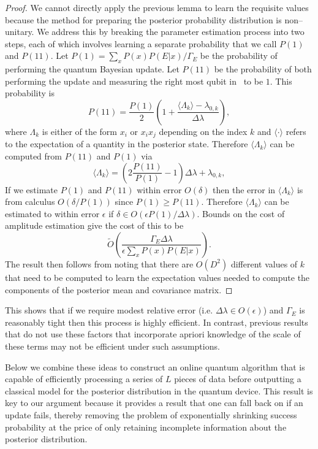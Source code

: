 \documentclass[aps,amsmath,onecolumn,amssymb,notitlepage]{revtex4-1}
\begin{document}
\begin{proof}
We cannot directly apply the previous lemma to learn the requisite values because the method for preparing the posterior probability distribution is non--unitary.
We address this by breaking the parameter estimation process into two steps, each of which involves learning a separate probability that we call $P(1)$ and $P(11)$.
Let $P(1)= \sum_x P(x) P(E|x)/\Gamma_E$ be the probability of performing the quantum Bayesian update.  Let $P(11)$ be the probability of both performing the update and measuring the right most qubit in~ to be $1$.  This probability is
\begin{equation}
P(11) = \frac{P(1)}{2}\left(1+\frac{\langle \Lambda_k \rangle -\lambda_{0,k}}{\Delta \lambda} \right),
\end{equation}
where $\Lambda_k$ is either of the form $x_i$ or $x_ix_j$ depending on the index $k$ and $\langle \cdot \rangle$ refers to the expectation of a quantity in the posterior state.
Therefore $\langle \Lambda_k \rangle$ can be computed from $P(11)$ and $P(1)$ via
\begin{equation}
\langle \Lambda_k \rangle = \left(2\frac{P(11)}{P(1)}-1 \right)\Delta \lambda + \lambda_{0,k},
\end{equation}
If we estimate $P(1)$ and $P(11)$ within error $O(\delta)$ then the error in $\langle \Lambda_k \rangle$ is from calculus $O(\delta/P(1))$ since $P(1)\ge P(11)$.  Therefore $\langle \Lambda_k \rangle$ can be estimated to within error $\epsilon$ if $\delta \in O(\epsilon P(1) /\Delta \lambda)$.  Bounds on the cost of amplitude estimation give the cost of this to be~\cite{BHM+02}
\begin{equation}
\tilde{O} \left(\frac{\Gamma_E \Delta \lambda}{\epsilon \sum_x P(x) P(E|x)} \right).
\end{equation}
The result then follows from noting that there are $O(D^2)$ different values of $k$ that need to be computed to learn the expectation values needed to compute the components of the posterior mean and covariance matrix.
\end{proof}
This shows that if we require modest relative error (i.e. $\Delta \lambda \in O(\epsilon)$) and $\Gamma_E$ is reasonably tight then this process is highly efficient.  In contrast, previous results that do not use these factors that incorporate apriori knowledge of the scale of these terms may not be efficient under such assumptions.

Below we combine these ideas to construct an online quantum algorithm that is capable of efficiently processing a series of $L$ pieces of data before outputting a classical model for the posterior distribution in the quantum device.  This result is key to our argument because it provides a result that one can fall back on if an update fails, thereby removing the problem of exponentially shrinking success probability at the price of only retaining incomplete information about the posterior distribution.
\end{document}

